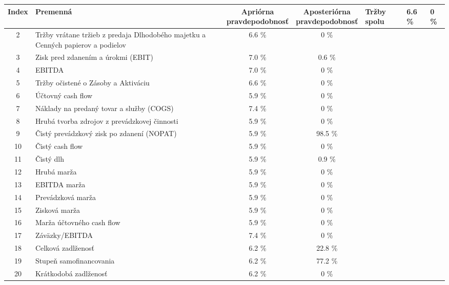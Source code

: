 \begin{longtable}{ |c|p{7cm}|c|c| }
        \hline
        Index & Premenná & \makecell{Apriórna \\ pravdepodobnosť} & \makecell{Aposteriórna \\ pravdepodobnosť} \endhead
        \hline
        1 & Tržby spolu & 6.6 \% & 0 \% \\
        \hline
        2 & Tržby vrátane tržieb z predaja Dlhodobého majetku a Cenných papierov a podielov & 6.6 \% & 0 \% \\
        \hline
        3 & Zisk pred zdanením a úrokmi (EBIT) & 7.0 \% & 0.6 \% \\
        \hline
        4 & EBITDA & 7.0 \% & 0 \% \\
        \hline
        5 & Tržby očistené o Zásoby a Aktiváciu & 6.6 \% & 0 \% \\
        \hline
        6 & Účtovný cash flow & 5.9 \% & 0 \% \\
        \hline
        7 & Náklady na predaný tovar a služby (COGS) & 7.4 \% & 0 \% \\
        \hline
        8 & Hrubá tvorba zdrojov z prevádzkovej činnosti & 5.9 \% & 0 \% \\
        \hline
        9 & Čistý prevádzkový zisk po zdanení (NOPAT) & 5.9 \% & 98.5 \% \\
        \hline
        10 & Čistý cash flow & 5.9 \% & 0 \% \\
        \hline
        11 & Čistý dlh & 5.9 \% & 0.9 \% \\
        \hline
        12 & Hrubá marža & 5.9 \% & 0 \% \\
        \hline
        13 & EBITDA marža & 5.9 \% & 0 \% \\
        \hline
        14 & Prevádzková marža & 5.9 \% & 0 \% \\
        \hline
        15 & Zisková marža & 5.9 \% & 0 \% \\
        \hline
        16 & Marža účtovného cash flow & 5.9 \% & 0 \% \\
        \hline
        17 & Záväzky/EBITDA & 7.4 \% & 0 \% \\
        \hline
        18 & Celková zadlženosť & 6.2 \% & 22.8 \% \\
        \hline
        19 & Stupeň samofinancovania & 6.2 \% & 77.2 \% \\
        \hline
        20 & Krátkodobá zadlženosť & 6.2 \% & 0 \% \\

\end{longtable}
